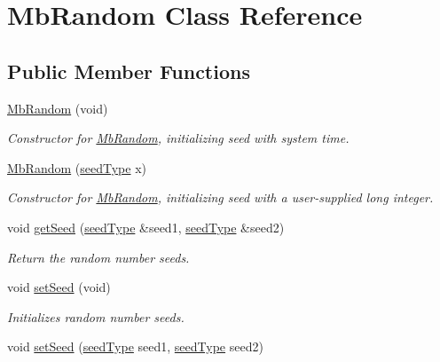 \hypertarget{class_mb_random}{}\section{Mb\+Random Class Reference}
\label{class_mb_random}
\subsection*{Public Member Functions}
\begin{DoxyCompactItemize}
\item 
\mbox{\hyperlink{class_mb_random_a93258da000d2831829903edc33c4d09c}{Mb\+Random}} (void)
\begin{DoxyCompactList}\small\item\em Constructor for \mbox{\hyperlink{class_mb_random}{Mb\+Random}}, initializing seed with system time. \end{DoxyCompactList}\item 
\mbox{\hyperlink{class_mb_random_abdb7e84805b33b3158a4d0d121330f84}{Mb\+Random}} (\mbox{\hyperlink{_mb_random_8h_a4aa644a391dc423f6cb86710cc056d8b}{seed\+Type}} x)
\begin{DoxyCompactList}\small\item\em Constructor for \mbox{\hyperlink{class_mb_random}{Mb\+Random}}, initializing seed with a user-\/supplied long integer. \end{DoxyCompactList}\item 
void \mbox{\hyperlink{class_mb_random_a5a143a97da5fa43d5220fc628ceabe25}{get\+Seed}} (\mbox{\hyperlink{_mb_random_8h_a4aa644a391dc423f6cb86710cc056d8b}{seed\+Type}} \&seed1, \mbox{\hyperlink{_mb_random_8h_a4aa644a391dc423f6cb86710cc056d8b}{seed\+Type}} \&seed2)
\begin{DoxyCompactList}\small\item\em Return the random number seeds. \end{DoxyCompactList}\item 
void \mbox{\hyperlink{class_mb_random_a2ec0fc6f556b74b4dbac8daee90268f6}{set\+Seed}} (void)
\begin{DoxyCompactList}\small\item\em Initializes random number seeds. \end{DoxyCompactList}\item 
void \mbox{\hyperlink{class_mb_random_a737fb472831030eaa72d86e93a47d365}{set\+Seed}} (\mbox{\hyperlink{_mb_random_8h_a4aa644a391dc423f6cb86710cc056d8b}{seed\+Type}} seed1, \mbox{\hyperlink{_mb_random_8h_a4aa644a391dc423f6cb86710cc056d8b}{seed\+Type}} seed2)

\end{DoxyCompactItemize}
